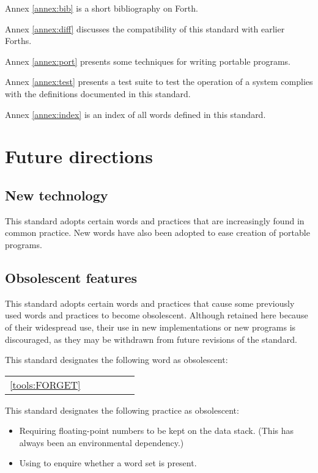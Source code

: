 Annex \ref{annex:bib} is a short bibliography on Forth.


Annex \ref{annex:diff} discusses the compatibility of this standard
with earlier Forths.

Annex \ref{annex:port} presents some techniques for writing portable
programs.

\ifrelease\else
Annex \ref{annex:test} presents a test suite to test the operation
of a system complies with the definitions documented in this
standard.
\fi

Annex \ref{annex:index} is an index of all words defined in this
standard.

\section{Future directions}

\subsection{New technology}

This standard adopts certain words and practices that are
increasingly found in common practice. New words have also
been adopted to ease creation of portable programs.

\subsection{Obsolescent features}
\label{intro:obsoleat}

This standard adopts certain words and practices that cause
some previously used words and practices to become obsolescent.
Although retained here because of their widespread use, their
use in new implementations or new programs is discouraged,
as they may be withdrawn from future revisions of the standard.

This standard designates the following word as obsolescent:

\begin{tabular}{rl@{\qquad}rl@{\qquad}rl}
	\ref{tools:FORGET}	& \word[tools]{FORGET}	\\
\end{tabular}

This standard designates the following practice as obsolescent:

\begin{itemize}
\item Requiring floating-point numbers to be kept on the data stack.
	(This has always been an environmental dependency.)

\item Using  to enquire whether a word set is present.
\end{itemize}

